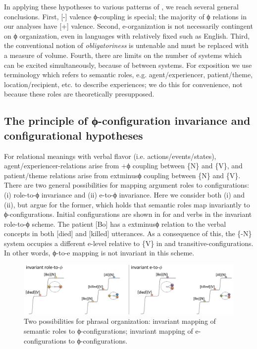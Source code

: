   In applying these hypotheses to various patterns of , we reach several general conclusions. First, [-] valence ϕ-coupling is special; the majority of ϕ relations in our analyses have [+] valence. Second, e-organization is not necessarily contingent on ϕ organization, even in languages with relatively fixed  such as English. Third, the conventional notion of \textit{obligatoriness} is untenable and must be replaced with a measure of  volume. Fourth, there are limits on the number of systems which can be excited simultaneously, because of  between systems. For exposition we use terminology which refers to semantic roles, e.g. agent/experiencer, patient/theme, location/recipient, etc. to describe  experiences; we do this for convenience, not because these roles are theoretically presupposed.

\subsection{The principle of \textup{ϕ-configuration} invariance and configurational hypotheses}

For relational meanings with verbal flavor (i.e. actions/events/states), agent/ex\-pe\-ri\-en\-cer-relations arise from +ϕ coupling between \{N\} and \{V\}, and patient/theme relations arise from 	extminus{}ϕ coupling between \{N\} and \{V\}. There are two general possibilities for mapping argument roles to configurations: (i) role-to-ϕ invariance and (ii) e-to-ϕ invariance. Here we consider both (i) and (ii), but argue for the former, which holds that semantic roles map invariantly to ϕ-configurations. Initial configurations are shown in {} for  and  verbs in the invariant role-to-ϕ scheme. The patient [Bo] has a 	extminus{}ϕ relation to the verbal concepts in both  [died] and  [killed] utterances. As a consequence of this, the \{-N\} system occupies a different e-level relative to \{V\} in  and transitive-configurations. In other words, ϕ-to-e mapping is not invariant in this scheme.

  
\begin{figure}
\includegraphics[width=\textwidth]{figures/Tilsen-img71.png}
\caption{Two possibilities for phrasal organization: invariant mapping of semantic roles to ϕ-configurations; invariant mapping of e-configurations to ϕ-configurations.}
\label{fig:4:21}
\end{figure}
 

